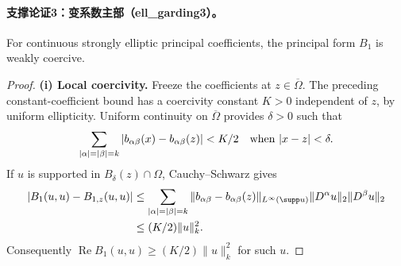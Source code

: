 \paragraph{支撑论证3：变系数主部（ell\_garding3）。}
For continuous strongly elliptic principal coefficients, the principal
form $B_1$ is weakly coercive.
\begin{proof}
\textbf{(i) Local coercivity.}
Freeze the coefficients at $z\in\overline\Omega$. The preceding
constant-coefficient bound has a coercivity constant $K>0$ independent
of $z$, by uniform ellipticity. Uniform continuity on $\overline\Omega$
provides $\delta>0$ such that
\[
\sum_{|\alpha|=|\beta|=k}|b_{\alpha\beta}(x)-b_{\alpha\beta}(z)|<K/2
\quad\hbox{when }|x-z|<\delta.
\]
If $u$ is supported in $B_\delta(z)\cap\Omega$, Cauchy--Schwarz gives
\begin{align*}
|B_1(u,u)-B_{1,z}(u,u)|
&\leq\sum_{|\alpha|=|\beta|=k}
 \|b_{\alpha\beta}-b_{\alpha\beta}(z)\|_{L^\infty(\supp u)}
 \|D^\alpha u\|_2\|D^\beta u\|_2\\
&\leq(K/2)\|u\|_k^2.
\end{align*}
Consequently $\operatorname{Re}B_1(u,u)\geq(K/2)\|u\|_k^2$ for such $u$.


\end{proof}
